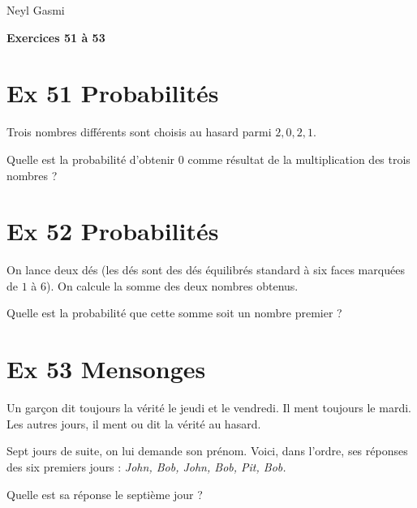 \documentclass[a4paper,11pt]{article}
\begin{document}
Neyl Gasmi
\begin{center}
{\Large \textbf{Exercices 51 à 53}}
\end{center}
\bigskip


\section*{Ex 51 \quad Probabilités}
Trois nombres différents sont choisis au hasard parmi \(2, 0, 2, 1\).  

Quelle est la probabilité d’obtenir \(0\) comme résultat de la multiplication des trois nombres ?


\section*{Ex 52 \quad Probabilités}
On lance deux dés (les dés sont des dés équilibrés standard à six faces marquées de \(1\) à \(6\)).  
On calcule la somme des deux nombres obtenus.  

Quelle est la probabilité que cette somme soit un nombre premier ?


\section*{Ex 53 \quad Mensonges}
Un garçon dit toujours la vérité le jeudi et le vendredi.  
Il ment toujours le mardi.  
Les autres jours, il ment ou dit la vérité au hasard.  

Sept jours de suite, on lui demande son prénom. Voici, dans l’ordre, ses réponses des six premiers jours :  
\emph{John, Bob, John, Bob, Pit, Bob.}  

Quelle est sa réponse le septième jour ?
\end{document}
